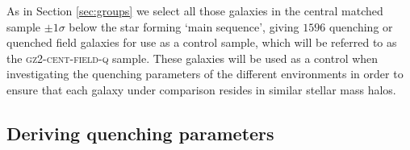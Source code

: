 \documentclass[useAMS,usenatbib]{mn2e}
\begin{document}
As in Section \ref{sec:groups} we select all those galaxies in the central matched sample $\pm1\sigma$ below the star forming `main sequence', giving $1596$ quenching or quenched field galaxies for use as a control sample, which will be referred to as the \textsc{gz2-cent-field-q} sample. These galaxies will be used as a control when investigating the quenching parameters of the different environments in order to ensure that each galaxy under comparison resides in similar stellar mass halos. 
  

\begin{figure}
\label{fig:zcompare}
\end{figure}

\subsection{Deriving quenching parameters}\label{sec:starpy}
\end{document}
